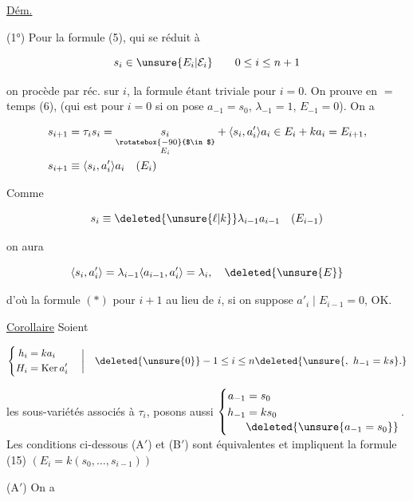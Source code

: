 

\uline{Dém.}

(1°) Pour la formule (5), qui se réduit à

\[s_i\in\unsure{E_i|\mathcal E_i}\qquad 0\leq i\leq n+1\]

on procède par réc. sur $i$, la formule étant triviale pour $i=0$. On prouve en $=$ temps (6), (qui est  pour $i=0$ si on pose $a_{-1}=s_0$, $\lambda_{-1}=1$, $E_{-1}=0$). On a

\[\begin{aligned}s_{i+1}&=\tau_i s_i=\underset{\substack{\rotatebox{-90}{$\in$}\\ E_i}}{s_i}+\langle s_i,a'_i\rangle a_i\in E_i+k a_i=E_{i+1},\\s_{i+1}&\equiv\langle s_i,a'_i\rangle a_i\quad(E_i)\end{aligned}\]

Comme

\[s_i\equiv\deleted{\unsure{\ell|k}}\lambda_{i-1}a_{i-1}\quad(E_{i-1})\]

on aura

\[\langle s_i,a'_i\rangle=\lambda_{i-1}\langle a_{i-1},a'_i\rangle=\lambda_i,\quad\deleted{\unsure{E}}\]

d'où la formule $(*)$ pour $i+1$ au lieu de $i$, si on suppose $a'_i\mid E_{i-1}=0$, OK.

\uline{Corollaire} Soient

\[\left\{\begin{aligned}h_i&=k a_i\\ H_i&=\operatorname{Ker}a'_i\end{aligned}\right.\quad\bigg|\quad\deleted{\unsure{0}}-1\leq i\leq n\deleted{\unsure{,\ h_{-1}=ks}.}\]


les sous-variétés associés à $\tau_i$, posons aussi $\left\{\begin{aligned}a_{-1}&=s_0\\h_{-1}&=ks_0\\[-2pt]&\deleted{\unsure{a_{-1}=s_0}}\end{aligned}\right.$. Les conditions  ci-dessous (A$'$) et (B$'$) sont équivalentes et impliquent la formule (15) $(E_i=k(s_0,\ldots,s_{i-1}))$

(A$'$) On a

